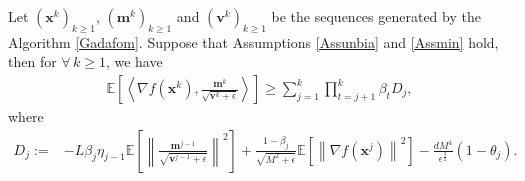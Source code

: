 \documentclass[twoside,11pt]{article}
\begin{document}
\begin{lemma}\label{LemTheta}
Let $({\mathbf{x}}^k)_{k\ge 1}$, $({\mathbf{m}}^k)_{k\ge 1}$ and $({\mathbf{v}}^k)_{k\ge 1}$ be the sequences generated by the Algorithm \ref{Gadafom}. Suppose that Assumptions \ref{Assunbia} and \ref{Assmin}  hold, then for $\forall\, k\ge 1$, we have
\begin{align}\label{LemTheta.1}
   	\mathbb{E}\left[ \left\langle \nabla f(\mathbf{x}^k),\frac{\mathbf{m}^k}{{\sqrt{{\mathbf{v}}^k+\epsilon}}}\right\rangle\right]
   	\ge\sum_{j=1}^{k}\prod_{t=j+1}^{k}{\beta_{t}}D_j,\nonumber
\end{align}
where
\begin{align}
   	D_j:=&-L{\beta_j} \eta_{j-1}\mathbb{E}\left[\left\| \frac{ \mathbf{m}^{j-1}}{{\sqrt{\mathbf{v}^{j-1}+\epsilon}}}\right\|^2\right] 
   	+\frac{1-{\beta_j}}{{\sqrt{M^2+\epsilon}}}\mathbb{E}\left[\left\| \nabla f(\mathbf{x}^j)\right\|^2\right]
   	-\frac{d  M^4}{\epsilon^{\frac{3}{2}}}(1-\theta_j).\nonumber
\end{align}	
\end{lemma}
\end{document}
